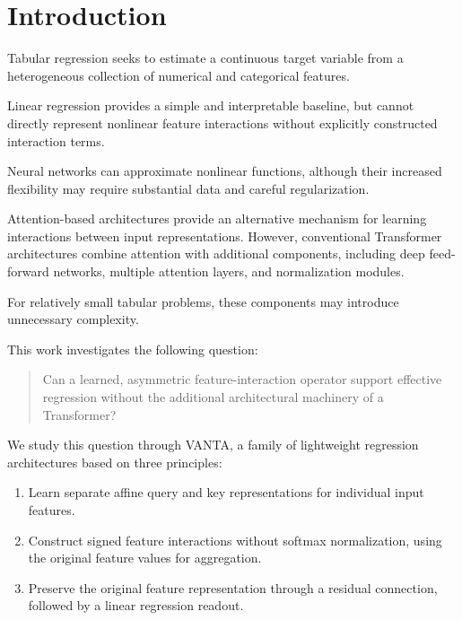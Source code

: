 \documentclass[11pt,a4paper]{article}
\begin{document}
\section{Introduction}

Tabular regression seeks to estimate a continuous
target variable from a heterogeneous collection
of numerical and categorical features.

Linear regression provides a simple and interpretable
baseline, but cannot directly represent nonlinear
feature interactions without explicitly constructed
interaction terms.

Neural networks can approximate nonlinear functions,
although their increased flexibility may require
substantial data and careful regularization.

Attention-based architectures provide an alternative
mechanism for learning interactions between input
representations. However, conventional Transformer
architectures combine attention with additional
components, including deep feed-forward networks,
multiple attention layers, and normalization modules.

For relatively small tabular problems, these
components may introduce unnecessary complexity.

This work investigates the following question:

\begin{quote}
Can a learned, asymmetric feature-interaction
operator support effective regression without
the additional architectural machinery of
a Transformer?
\end{quote}

We study this question through VANTA, a family
of lightweight regression architectures based on
three principles:

\begin{enumerate}[leftmargin=*]
    \item Learn separate affine query and key
    representations for individual input features.

    \item Construct signed feature interactions
    without softmax normalization, using the
    original feature values for aggregation.

    \item Preserve the original feature
    representation through a residual connection,
    followed by a linear regression readout.
\end{enumerate}
\end{document}
